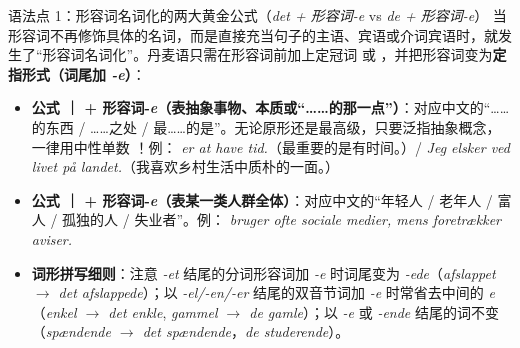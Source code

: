 \begin{grammatikbox}{语法点 1：形容词名词化的两大黄金公式（\textit{det + 形容词-e} vs \textit{de + 形容词-e}）}
当形容词不再修饰具体的名词，而是直接充当句子的主语、宾语或介词宾语时，就发生了“形容词名词化”。丹麦语只需在形容词前加上定冠词  或 ，并把形容词变为\textbf{定指形式（词尾加 \textit{-e}）}：
\begin{itemize}
  \item \textbf{公式 ｜ + 形容词-\textit{e}（表抽象事物、本质或“……的那一点”）}：对应中文的“……的东西 / ……之处 / 最……的是”。无论原形还是最高级，只要泛指抽象概念，一律用中性单数 ！例：\textit{ er at have tid.}（最重要的是有时间。）/ \textit{Jeg elsker  ved livet på landet.}（我喜欢乡村生活中质朴的一面。）
  \item \textbf{公式 ｜ + 形容词-\textit{e}（表某一类人群全体）}：对应中文的“年轻人 / 老年人 / 富人 / 孤独的人 / 失业者”。例：\textit{ bruger ofte sociale medier, mens  foretrækker aviser.}
  \item \textbf{词形拼写细则}：注意 \textit{-et} 结尾的分词形容词加 \textit{-e} 时词尾变为 \textit{-ede}（\textit{afslappet $\rightarrow$ det afslappede}）；以 \textit{-el/-en/-er} 结尾的双音节词加 \textit{-e} 时常省去中间的 \textit{e}（\textit{enkel $\rightarrow$ det enkle}, \textit{gammel $\rightarrow$ de gamle}）；以 \textit{-e} 或 \textit{-ende} 结尾的词不变（\textit{spændende $\rightarrow$ det spændende}，\textit{de studerende}）。
\end{itemize}
\end{grammatikbox}

